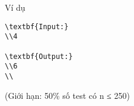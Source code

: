 Ví dụ
\begin{verbatim}
\textbf{Input:}
\\4

\textbf{Output:}
\\6
\\\end{verbatim}

   (Giới hạn: 50\% số test có n ≤ 250)